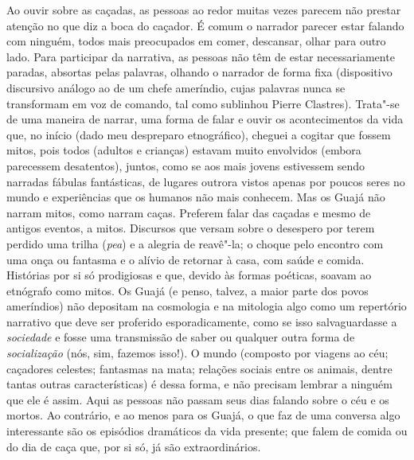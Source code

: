 Ao ouvir sobre as caçadas, as pessoas ao redor muitas vezes parecem não
prestar atenção no que diz a boca do caçador. É comum o narrador parecer
estar falando com ninguém, todos mais preocupados em comer, descansar,
olhar para outro lado. Para participar da narrativa, as pessoas não têm
de estar necessariamente paradas, absortas pelas palavras, olhando o
narrador de forma fixa (dispositivo discursivo análogo ao de um chefe
ameríndio, cujas palavras nunca se transformam em voz de comando, tal
como sublinhou Pierre Clastres). Trata"-se de uma maneira de narrar, uma
forma de falar e ouvir os acontecimentos da vida que, no início (dado
meu despreparo etnográfico), cheguei a cogitar que fossem mitos, pois
todos (adultos e crianças) estavam muito envolvidos (embora parecessem
desatentos), juntos, como se aos mais jovens estivessem sendo narradas
fábulas fantásticas, de lugares outrora vistos apenas por poucos seres
no mundo e experiências que os humanos não mais conhecem. Mas os Guajá
não narram mitos, como narram caças. Preferem falar das caçadas e mesmo
de antigos eventos, a mitos. Discursos que versam sobre o desespero por
terem perdido uma trilha (\emph{pea}) e a alegria de reavê"-la; o choque
pelo encontro com uma onça ou fantasma e o alívio de retornar à casa,
com saúde e comida. Histórias por si só prodigiosas e que, devido às
formas poéticas, soavam ao etnógrafo como mitos. Os Guajá (e penso,
talvez, a maior parte dos povos ameríndios) não depositam na cosmologia
e na mitologia algo como um repertório narrativo que deve ser proferido
esporadicamente, como se isso salvaguardasse a \emph{sociedade} e fosse
uma transmissão de saber ou qualquer outra forma de \emph{socialização}
(nós, sim, fazemos isso!). O mundo (composto por viagens ao céu;
caçadores celestes; fantasmas na mata; relações sociais entre os
animais, dentre tantas outras características) é dessa forma, e não
precisam lembrar a ninguém que ele é assim. Aqui as pessoas não passam
seus dias falando sobre o céu e os mortos. Ao contrário, e ao menos para
os Guajá, o que faz de uma conversa algo interessante são os episódios
dramáticos da vida presente; que falem de comida ou do dia de caça que,
por si só, já são extraordinários.

